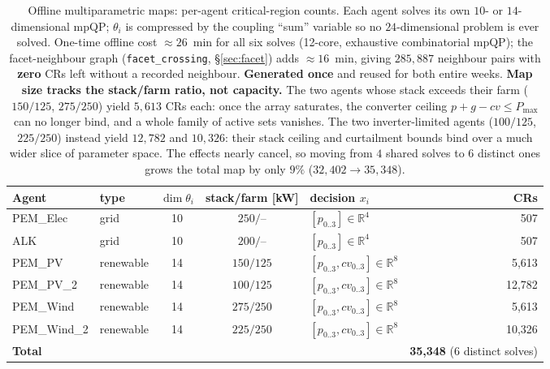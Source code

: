 \documentclass[11pt, letterpaper]{article}
\begin{document}
\begin{table}[H]\centering
\begin{tabular}{llcclr}
\toprule
Agent & type & $\dim\theta_i$ & stack/farm [kW] & decision $x_i$ & CRs\\
\midrule
PEM\_Elec   & grid      & 10 & $250/$--    & $[p_{0..3}]\in\mathbb R^4$           & 507\\
ALK         & grid      & 10 & $200/$--    & $[p_{0..3}]\in\mathbb R^4$           & 507\\
PEM\_PV     & renewable & 14 & $150/125$   & $[p_{0..3},cv_{0..3}]\in\mathbb R^8$ & 5{,}613\\
PEM\_PV\_2  & renewable & 14 & $100/125$   & $[p_{0..3},cv_{0..3}]\in\mathbb R^8$ & 12{,}782\\
PEM\_Wind   & renewable & 14 & $275/250$   & $[p_{0..3},cv_{0..3}]\in\mathbb R^8$ & 5{,}613\\
PEM\_Wind\_2& renewable & 14 & $225/250$   & $[p_{0..3},cv_{0..3}]\in\mathbb R^8$ & 10{,}326\\
\midrule
\textbf{Total} & & & & & \textbf{35{,}348} (6 distinct solves)\\
\bottomrule
\end{tabular}
\caption{Offline multiparametric maps: per-agent critical-region counts. Each agent solves its own
$10$- or $14$-dimensional mpQP; $\theta_i$ is compressed by the coupling ``sum'' variable so no
$24$-dimensional problem is ever solved. One-time offline cost $\approx\!26$~min for all six solves
(12-core, exhaustive combinatorial mpQP); the facet-neighbour graph (\texttt{facet\_crossing},
\S\ref{sec:facet}) adds $\approx\!16$~min, giving $285{,}887$ neighbour pairs with \textbf{zero}
CRs left without a recorded neighbour.
\textbf{Generated once} and reused for both entire weeks.
\newline\textbf{Map size tracks the stack/farm ratio, not capacity.} The two agents whose stack
exceeds their farm ($150/125$, $275/250$) yield $5{,}613$ CRs each: once the array saturates, the
converter ceiling $p+g-cv\le P_{\max}$ can no longer bind, and a whole family of active sets
vanishes. The two inverter-limited agents ($100/125$, $225/250$) instead yield $12{,}782$ and
$10{,}326$: their stack ceiling and curtailment bounds bind over a much wider slice of parameter
space. The effects nearly cancel, so moving from $4$ shared solves to $6$ distinct ones grows the
total map by only $9\%$ ($32{,}402\to35{,}348$).}
\label{tab:cr}
\end{table}
\end{document}
